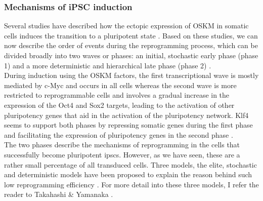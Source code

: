 

\subsubsection{Mechanisms of iPSC induction}


Several studies have described how the ectopic expression of OSKM in somatic cells induces the transition to a pluripotent state \cite{yamanaka2007strategies, brambrink2008sequential, stadtfeld2008induced, polo2012molecular, hansson2012highly, buganim2012single}. 
Based on these studies, we can now describe the order of events during the reprogramming process, which can be divided broadly into two waves or phases: an initial, stochastic early phase (phase 1) and a more deterministic and hierarchical late phase (phase 2) \cite{omole2018ten, takahashi2016decade, brouwer2016choices}.\\

During induction using the OSKM factors, the first transcriptional wave is mostly mediated by c-Myc and occurs in all cells whereas the second wave is more restricted to reprogrammable cells and involves a gradual increase in the expression of the Oct4 and Sox2 targets, leading to the activation of other pluripotency genes that aid in the activation of the pluripotency network. 
Klf4 seems to support both phases by repressing somatic genes during the first phase and facilitating the expression of pluripotency genes in the second phase \cite{buganim2013mechanisms}.\\

The two phases describe the mechanisms of reprogramming in the cells that successfully become pluripotent \glspl{ipsc}.
However, as we have seen, these are a rather small percentage of all transduced cells.
Three models, the elite, stochastic and deterministic models have been proposed to explain the reason behind such low reprogramming efficiency \cite{omole2018ten}.
For more detail into these three models, I refer the reader to Takahashi \& Yamanaka \cite{takahashi2016decade}.

